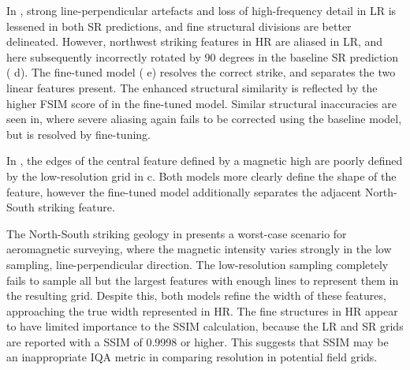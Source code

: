 In , strong line-perpendicular artefacts and loss of high-frequency detail in LR is lessened in both SR predictions, and fine structural divisions are better delineated.
However, northwest striking features in HR are aliased in LR, and here subsequently incorrectly rotated by 90 degrees in the baseline SR prediction ( d).
The fine-tuned model ( e) resolves the correct strike, and separates the two linear features present.
The enhanced structural similarity is reflected by the higher FSIM score of in the fine-tuned model. 
Similar structural inaccuracies are seen in, where severe aliasing again fails to be corrected using the baseline model, but is resolved by fine-tuning.

In , the edges of the central feature defined by a magnetic high are poorly defined by the low-resolution grid in  c.
Both models more clearly define the shape of the feature, however the fine-tuned model additionally separates the adjacent North-South striking feature.

The North-South striking geology in  presents a worst-case scenario for aeromagnetic surveying, where the magnetic intensity varies strongly in the low sampling, line-perpendicular direction.
The low-resolution sampling completely fails to sample all but the largest features with enough lines to represent them in the resulting grid.
Despite this, both models refine the width of these features, approaching the true width represented in HR\@.
The fine structures in HR appear to have limited importance to the SSIM calculation, because the LR and SR grids are reported with a SSIM of 0.9998 or higher.
This suggests that SSIM may be an inappropriate IQA metric in comparing resolution in potential field grids.

